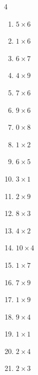 \begin{multicols}{4}
\begin{enumerate}
  \item $5\times 6$
        \phantom{$=30$}

  \item $1\times 6$
        \phantom{$=6$}

  \item $6\times 7$
        \phantom{$=42$}

  \item $4\times 9$
        \phantom{$=36$}

  \item $7\times 6$
        \phantom{$=42$}

  \item $9\times 6$
        \phantom{$=54$}

  \item $0\times 8$
        \phantom{$=0$}

  \item $1\times 2$
        \phantom{$=2$}

  \item $6\times 5$
        \phantom{$=30$}

  \item $3\times 1$
        \phantom{$=3$}

  \item $2\times 9$
        \phantom{$=18$}

  \item $8\times 3$
        \phantom{$=24$}

  \item $4\times 2$
        \phantom{$=8$}

  \item $10\times 4$
        \phantom{$=40$}

  \item $1\times 7$
        \phantom{$=7$}

  \item $7\times 9$
        \phantom{$=63$}

  \item $1\times 9$
        \phantom{$=9$}

  \item $9\times 4$
        \phantom{$=36$}

  \item $1\times 1$
        \phantom{$=1$}

  \item $2\times 4$
        \phantom{$=8$}

  \item $2\times 3$
        \phantom{$=6$}


\end{enumerate}
\end{multicols}
